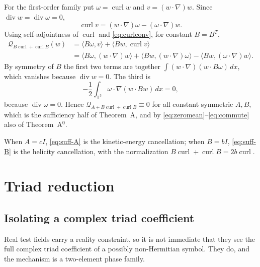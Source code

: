 \documentclass[11pt]{article}
\theoremstyle{definition}
\theoremstyle{remark}
\theoremstyle{plain}
\DeclareMathOperator{\curl}{curl}
\DeclareMathOperator{\dv}{div}
\newcommand{\T}{\mathbb{T}}
\newcommand{\Qform}{\mathcal{Q}}
\begin{document}
For the first-order family put $\omega=\curl w$ and $v=(w\cdot\nabla)w$.
Since $\dv w=\dv\omega=0$,
\begin{equation}
\label{eq:curlconv}
\curl v=(w\cdot\nabla)\omega-(\omega\cdot\nabla)w .
\end{equation}
Using self-adjointness of $\curl$ and \eqref{eq:curlconv}, for constant
$B=B^{T}$,
\begin{equation}
\label{eq:suff-B}
\begin{aligned}
\Qform_{B\curl+\curl B}(w)
&=\langle B\omega,v\rangle+\langle Bw,\curl v\rangle\\
&=\langle B\omega,(w\cdot\nabla)w\rangle
 +\langle Bw,(w\cdot\nabla)\omega\rangle
 -\langle Bw,(\omega\cdot\nabla)w\rangle .
\end{aligned}
\end{equation}
By symmetry of $B$ the first two terms are together
$\int(w\cdot\nabla)(w\cdot B\omega)\,dx$, which vanishes because $\dv w=0$.
The third is
\begin{equation}
\label{eq:suff-B2}
-\frac12\int_{\T^{3}}\omega\cdot\nabla(w\cdot Bw)\,dx=0 ,
\end{equation}
because $\dv\omega=0$. Hence $\Qform_{A+B\curl+\curl B}\equiv0$ for all
constant symmetric $A,B$, which is the sufficiency half of Theorem~A, and by
\eqref{eq:zeromean}--\eqref{eq:commute} also of Theorem~A$^{0}$.

When $A=cI$, \eqref{eq:suff-A} is the kinetic-energy cancellation; when
$B=bI$, \eqref{eq:suff-B} is the helicity cancellation, with the normalization
$B\curl+\curl B=2b\curl$.

\section{Triad reduction}
\label{sec:triad}

\subsection{Isolating a complex triad coefficient}
\label{subsec:phase}

Real test fields carry a reality constraint, so it is not immediate that they
see the full complex triad coefficient of a possibly non-Hermitian symbol.
They do, and the mechanism is a two-element phase family.
\end{document}
